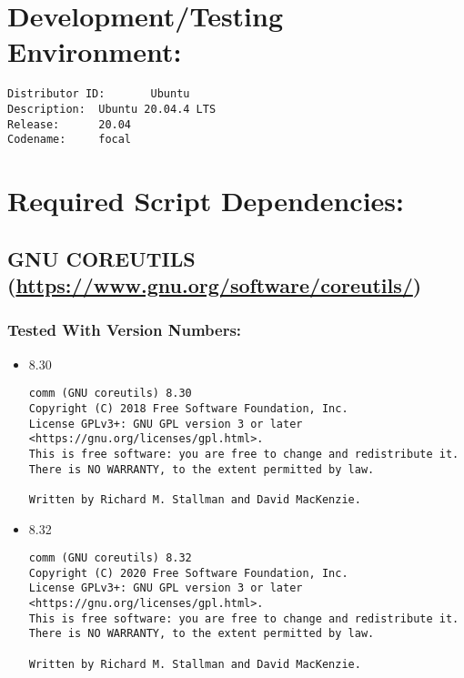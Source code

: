 \documentclass[11pt]{article}
\begin{document}
\noindent\makebox[\linewidth]{\rule{\paperwidth}{0.5pt}}
\section*{Development/Testing Environment:}
\label{sec:org6a3675c}
\begin{verbatim}
Distributor ID:       Ubuntu
Description:  Ubuntu 20.04.4 LTS
Release:      20.04
Codename:     focal
\end{verbatim}

\noindent\makebox[\linewidth]{\rule{\paperwidth}{0.5pt}}
\section*{Required Script Dependencies:}
\label{sec:org9630fd5}
\subsection*{GNU COREUTILS (\url{https://www.gnu.org/software/coreutils/})}
\label{sec:orgfde3df4}
\subsubsection*{Tested With Version Numbers:}
\label{sec:org360599b}
\begin{itemize}
\item 8.30
\label{sec:org36a51e1}
\begin{verbatim}
comm (GNU coreutils) 8.30
Copyright (C) 2018 Free Software Foundation, Inc.
License GPLv3+: GNU GPL version 3 or later <https://gnu.org/licenses/gpl.html>.
This is free software: you are free to change and redistribute it.
There is NO WARRANTY, to the extent permitted by law.

Written by Richard M. Stallman and David MacKenzie.
\end{verbatim}

\item 8.32
\label{sec:org1e9ebbe}
\begin{verbatim}
comm (GNU coreutils) 8.32
Copyright (C) 2020 Free Software Foundation, Inc.
License GPLv3+: GNU GPL version 3 or later <https://gnu.org/licenses/gpl.html>.
This is free software: you are free to change and redistribute it.
There is NO WARRANTY, to the extent permitted by law.

Written by Richard M. Stallman and David MacKenzie.
\end{verbatim}
\end{itemize}
\end{document}
